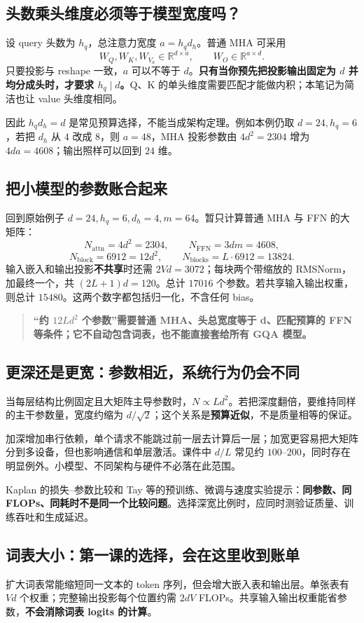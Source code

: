 \documentclass[UTF8,fontset=fandol,zihao=-4,a4paper]{ctexart}
\newcommand{\focus}[1]{\begin{quote}\small\color{accent}\bfseries #1\end{quote}}
\newcommand{\nextpage}{\clearpage}
\begin{document}
\subsection{头数乘头维度必须等于模型宽度吗？}
设 query 头数为 $h_q$，总注意力宽度 $a=h_qd_h$。普通 MHA 可采用
\[
W_Q,W_K,W_{V_a}\in\mathbb{R}^{d\times a},\qquad
W_O\in\mathbb{R}^{a\times d}.
\]
只要投影与 reshape 一致，$a$ 可以不等于 $d$。\textbf{只有当你预先把投影输出固定为 $d$ 并均分成头时，才要求 $h_q\mid d$。}Q、K 的单头维度需要匹配才能做内积；本笔记为简洁也让 value 头维度相同。

因此 $h_qd_h=d$ 是常见预算选择，不能当成架构定理。例如本例仍取 $d=24,h_q=6$，若把 $d_h$ 从 $4$ 改成 $8$，则 $a=48$，MHA 投影参数由 $4d^2=2304$ 增为 $4da=4608$；输出照样可以回到 $24$ 维。

\subsection{把小模型的参数账合起来}
回到原始例子 $d=24,h_q=6,d_h=4,m=64$。暂只计算普通 MHA 与 FFN 的大矩阵：
\[
N_{\text{attn}}=4d^2=2304,\qquad
N_{\text{FFN}}=3dm=4608,
\]
\[
N_{\text{block}}=6912=12d^2,\qquad
N_{\text{blocks}}=L\cdot6912=13824.
\]
输入嵌入和输出投影\textbf{不共享}时还需 $2Vd=3072$；每块两个带缩放的 RMSNorm，加最终一个，共 $(2L+1)d=120$。总计 $17016$ 个参数。若共享输入输出权重，则总计 $15480$。这两个数字都包括归一化，不含任何 bias。

\focus{“约 $12Ld^2$ 个参数”需要普通 MHA、头总宽度等于 d、匹配预算的 FFN 等条件；它不自动包含词表，也不能直接套给所有 GQA 模型。}

\nextpage
\subsection{更深还是更宽：参数相近，系统行为仍会不同}
当每层结构比例固定且大矩阵主导参数时，$N\propto Ld^2$。若把深度翻倍，要维持同样的主干参数量，宽度约缩为 $d/\sqrt2$；这个关系是\textbf{预算近似}，不是质量相等的保证。

加深增加串行依赖，单个请求不能跳过前一层去计算后一层；加宽更容易把大矩阵分到多设备，但也影响通信和单层激活。课件中 $d/L$ 常见约 $100$--$200$，同时存在明显例外。小模型、不同架构与硬件不必落在此范围。

Kaplan 的损失--参数比较和 Tay 等的预训练、微调与速度实验提示：\textbf{同参数、同 FLOPs、同耗时不是同一个比较问题}。选择深宽比例时，应同时测验证质量、训练吞吐和生成延迟。

\subsection{词表大小：第一课的选择，会在这里收到账单}
扩大词表常能缩短同一文本的 token 序列，但会增大嵌入表和输出层。单张表有 $Vd$ 个权重；完整输出投影每个位置约需 $2dV$ FLOPs。共享输入输出权重能省参数，\textbf{不会消除词表 logits 的计算}。
\end{document}
